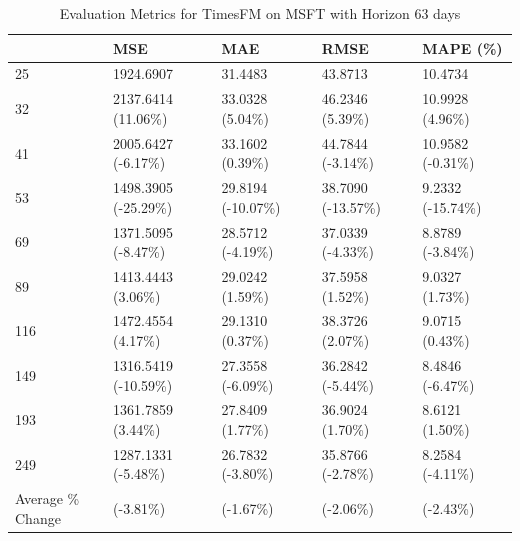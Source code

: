 \begin{table}
\caption{Evaluation Metrics for TimesFM on MSFT with Horizon 63 days}
\label{tab:fm_MSFT_h63_metrics}
\begin{tabular}{lllll}
\toprule
 & MSE & MAE & RMSE & MAPE (\%) \\
\midrule
25 & 1924.6907 & 31.4483 & 43.8713 & 10.4734 \\
32 & 2137.6414 (11.06\%) & 33.0328 (5.04\%) & 46.2346 (5.39\%) & 10.9928 (4.96\%) \\
41 & 2005.6427 (-6.17\%) & 33.1602 (0.39\%) & 44.7844 (-3.14\%) & 10.9582 (-0.31\%) \\
53 & 1498.3905 (-25.29\%) & 29.8194 (-10.07\%) & 38.7090 (-13.57\%) & 9.2332 (-15.74\%) \\
69 & 1371.5095 (-8.47\%) & 28.5712 (-4.19\%) & 37.0339 (-4.33\%) & 8.8789 (-3.84\%) \\
89 & 1413.4443 (3.06\%) & 29.0242 (1.59\%) & 37.5958 (1.52\%) & 9.0327 (1.73\%) \\
116 & 1472.4554 (4.17\%) & 29.1310 (0.37\%) & 38.3726 (2.07\%) & 9.0715 (0.43\%) \\
149 & 1316.5419 (-10.59\%) & 27.3558 (-6.09\%) & 36.2842 (-5.44\%) & 8.4846 (-6.47\%) \\
193 & 1361.7859 (3.44\%) & 27.8409 (1.77\%) & 36.9024 (1.70\%) & 8.6121 (1.50\%) \\
249 & 1287.1331 (-5.48\%) & 26.7832 (-3.80\%) & 35.8766 (-2.78\%) & 8.2584 (-4.11\%) \\
Average \% Change & (-3.81\%) & (-1.67\%) & (-2.06\%) & (-2.43\%) \\
\bottomrule
\end{tabular}
\end{table}
